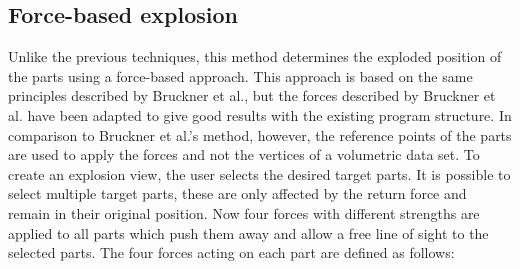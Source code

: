 \subsection{Force-based explosion}
Unlike the previous techniques, this method determines the exploded position of the parts using a force-based approach.
This approach is based on the same principles described by Bruckner et al., but the forces described by Bruckner et al. have been adapted to give good results with the existing program structure.\cite{Bruckner_2006}
In comparison to Bruckner et al.'s method, however, the reference points of the parts are used to apply the forces and not the vertices of a volumetric data set.
To create an explosion view, the user selects the desired target parts. 
It is possible to select multiple target parts, these are only affected by the return force and remain in their original position.
Now four forces with different strengths are applied to all parts which push them away and allow a free line of sight to the selected parts.
The four forces acting on each part are defined as follows:
